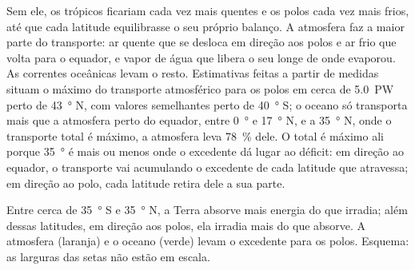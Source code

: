 Sem ele, os trópicos ficariam cada vez mais quentes e os polos cada vez
mais frios, até que cada latitude equilibrasse o seu próprio balanço. A
atmosfera faz a maior parte do transporte: ar quente que se desloca em
direção aos polos e ar frio que volta para o equador, e vapor de água que
libera o seu  longe de onde evaporou. As correntes oceânicas
levam o resto. Estimativas feitas a partir de medidas situam o máximo do
transporte atmosférico para os polos em cerca de \qty{5.0}{PW} perto de
\qty{43}{\degree} N, com valores semelhantes perto de \qty{40}{\degree} S; o
oceano só transporta mais que a atmosfera perto do equador, entre
\qty{0}{\degree} e \qty{17}{\degree} N, e a \qty{35}{\degree} N, onde o
transporte total é máximo, a atmosfera leva \qty{78}{\percent} dele. O
total é máximo ali porque \qty{35}{\degree} é mais ou menos onde o
excedente dá lugar ao déficit: em direção ao equador, o transporte vai
acumulando o excedente de cada latitude que atravessa; em direção ao polo,
cada latitude retira dele a sua parte.

\begin{omfigure}

{\small Entre cerca de \qty{35}{\degree} S e \qty{35}{\degree} N, a Terra
absorve mais energia do que irradia; além dessas latitudes, em direção aos
polos, ela irradia mais do que absorve. A atmosfera (laranja) e o oceano
(verde) levam o excedente para os polos. Esquema: as larguras das setas não
estão em escala.}
\end{omfigure}

